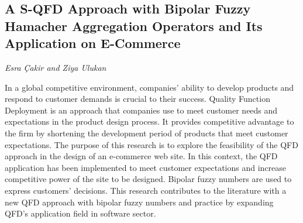 \documentclass[../booklet.tex]{subfiles}
\begin{document}
\subsection[A S-QFD Approach with Bipolar Fuzzy Hamacher Aggregation Operators and Its Application on E-Commerce. {\it Esra Çakir and Ziya Ulukan}]{A S-QFD Approach with Bipolar Fuzzy Hamacher Aggregation Operators and Its Application on E-Commerce}
 

\begin{center}
  {\it Esra Çakir and Ziya Ulukan}
\end{center}

\vskip 0.8cm

In a global competitive environment, companies' ability to develop products and respond to customer demands is crucial to their success. Quality Function Deployment is an approach that companies use to meet customer needs and expectations in the product design process. It provides competitive advantage to the firm by shortening the development period of products that meet customer expectations. The purpose of this research is to explore the feasibility of the QFD approach in the design of an e-commerce web site. In this context, the QFD application has been implemented to meet customer expectations and increase competitive power of the site to be designed. Bipolar fuzzy numbers are used to express customers' decisions. This research contributes to the literature with a new QFD approach with bipolar fuzzy numbers and practice by expanding QFD's application field in software sector.
\end{document}
